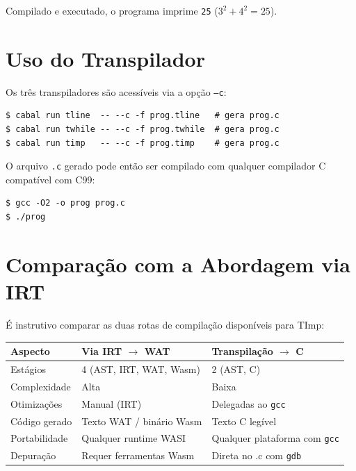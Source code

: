 Compilado e executado, o programa imprime \texttt{25} ($3^2 + 4^2 = 25$).

\section{Uso do Transpilador}\label{sec:transp-uso}

Os três transpiladores são acessíveis via a opção \texttt{--c}:

\begin{verbatim}
$ cabal run tline  -- --c -f prog.tline   # gera prog.c
$ cabal run twhile -- --c -f prog.twhile  # gera prog.c
$ cabal run timp   -- --c -f prog.timp    # gera prog.c
\end{verbatim}

O arquivo \texttt{.c} gerado pode então ser compilado com qualquer compilador
C compatível com C99:

\begin{verbatim}
$ gcc -O2 -o prog prog.c
$ ./prog
\end{verbatim}

\section{Comparação com a Abordagem via IRT}\label{sec:transp-vs-irt}

É instrutivo comparar as duas rotas de compilação disponíveis para TImp:

\begin{center}
\begin{tabular}{lll}
\hline
\textbf{Aspecto} & \textbf{Via IRT $\to$ WAT} & \textbf{Transpilação $\to$ C} \\
\hline
Estágios             & 4 (AST, IRT, WAT, Wasm) & 2 (AST, C) \\
Complexidade         & Alta                    & Baixa \\
Otimizações          & Manual (IRT)            & Delegadas ao \texttt{gcc} \\
Código gerado        & Texto WAT / binário Wasm & Texto C legível \\
Portabilidade        & Qualquer runtime WASI   & Qualquer plataforma com \texttt{gcc} \\
Depuração            & Requer ferramentas Wasm & Direta no .c com \texttt{gdb} \\
\hline
\end{tabular}
\end{center}

